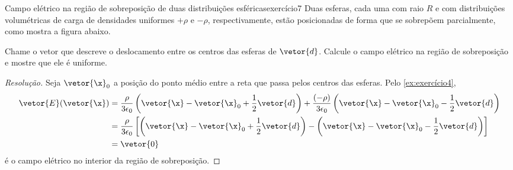 \begin{exercício}{Campo elétrico na região de sobreposição de duas distribuições esféricas}{exercício7}
    Duas esferas, cada uma com raio \(R\) e com distribuições volumétricas de carga de densidades uniformes \(+\rho\) e \(-\rho\), respectivamente, estão posicionadas de forma que se sobrepõem parcialmente, como mostra a figura abaixo.
    \begin{center}
    \end{center}
    Chame o vetor que descreve o deslocamento entre os centros das esferas de \(\vetor{d}\). Calcule o campo elétrico na região de sobreposição e mostre que ele é uniforme.
\end{exercício}
\begin{proof}[Resolução]
    Seja \(\vetor{\x}_0\) a posição do ponto médio entre a reta que passa pelos centros das esferas. Pelo \cref{ex:exercício4},
    \begin{align*}
        \vetor{E}(\vetor{\x}) &= \frac{\rho}{3\epsilon_0}\left(\vetor{\x} - \vetor{\x}_0 + \frac12 \vetor{d}\right) + \frac{(-\rho)}{3 \epsilon_0}\left(\vetor{\x} - \vetor{\x}_0 - \frac12\vetor{d}\right)\\
                              &= \frac{\rho}{3 \epsilon_0}\left[\left(\vetor{\x} - \vetor{\x}_0 + \frac12 \vetor{d}\right) - \left(\vetor{\x} - \vetor{\x}_0 - \frac12 \vetor{d}\right)\right]\\
                              &= \vetor{0}
    \end{align*}
    é o campo elétrico no interior da região de sobreposição.
\end{proof}
